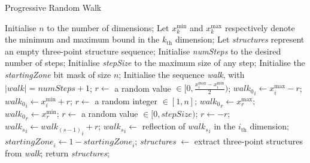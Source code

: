 \documentclass[conference]{IEEEtran}
\begin{document}
\begin{algorithm}[!t]
	\caption{Progressive Random Walk}
	\label{algProgRandomWalk}
	\begin{algorithmic}
		\STATE Initialise $n$ to the number of dimensions;
		\STATE Let $x_k^{\text{min}}$ and $x_k^{\text{max}}$ respectively denote the minimum and maximum bound in the $k_{\text{th}}$ dimension;
		\STATE Let \textit{structures} represent an empty three-point structure sequence;
		\STATE Initialise \textit{numSteps} to the desired number of steps;
		\STATE Initialise \textit{stepSize} to the maximum size of any step;
		\STATE Initialise the \textit{startingZone} bit mask of size $n$; 
		\STATE Initialise the sequence \textit{walk}, with $\lvert \textit{walk} \rvert = \textit{numSteps} + 1$;
			\STATE	$r \gets$ a random value $\in [0, \frac{x_i^{\text{max}} - x_i^{\text{min}}}{2})$;	
				\STATE ${{\textit{walk}}_0}_i \gets x_i^{\text{max}} - r$;
			\ELSE
				\STATE ${{\textit{walk}}_0}_i \gets x_i^{\text{min}} + r$;
			\ENDIF			
		\ENDFOR
		\STATE $r \gets$ a random integer $\in [1,n]$;
			\STATE ${{\textit{walk}}_0}_{r} \gets x_{r}^{\text{max}}$;
		\ELSE
			\STATE ${{\textit{walk}}_0}_{r} \gets x_{r}^{\text{min}}$;
		\ENDIF	
				\STATE	$r \gets$ a random value $\in [0, \textit{stepSize})$;	
					\STATE $r \gets -r$;				
				\ENDIF			
				\STATE ${{\textit{walk}}_s}_i \gets {{\textit{walk}}_{(s-1)}}_i + r$;
					\STATE ${{\textit{walk}}_s}_i \gets$ reflection of ${{\textit{walk}}_s}_i$ in the $i_{\text{th}}$ dimension;
					\STATE ${\textit{startingZone}}_i \gets 1 - {\textit{startingZone}}_i$;
				\ENDIF
			\ENDFOR	
		\ENDFOR
		\STATE \textit{structures} $\gets$ extract three-point structures from \textit{walk};
		\STATE return \textit{structures};
	\end{algorithmic}	
\end{algorithm} 
\end{document}
